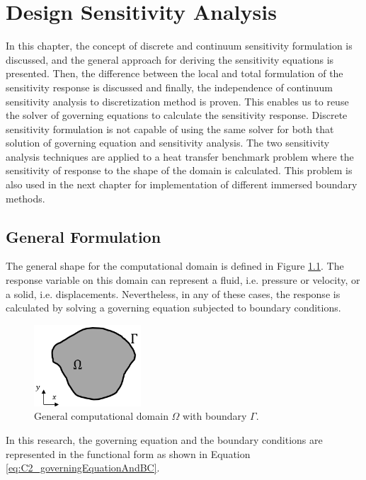 \chapter{Design Sensitivity Analysis}\label{ch:sensitivityAnalysis}
In this chapter, the concept of discrete and continuum sensitivity formulation is discussed, and the general approach for deriving the sensitivity equations is presented. Then, the difference between the local and total formulation of the sensitivity response is discussed and finally, the independence of continuum sensitivity analysis to discretization method is proven. This enables us to reuse the solver of governing equations to calculate the sensitivity response. Discrete sensitivity formulation is not capable of using the same solver for both that solution of governing equation and sensitivity analysis. The two sensitivity analysis techniques are applied to a heat transfer benchmark problem where the sensitivity of response to the shape of the domain is calculated. This problem is also used in the next chapter for implementation of different immersed boundary methods.

\section{General Formulation}
The general shape for the computational domain is defined in Figure \ref{fig:C2_continuumDomain}. The response variable on this domain can represent a fluid, i.e. pressure or velocity, or a solid, i.e. displacements. Nevertheless, in any of these cases, the response is calculated by solving a governing equation subjected to boundary conditions. 

\begin{figure}
    \centering
    \includegraphics[width=4.00cm]{Chapter_2/figure/general_domain.png}
    \caption{General computational domain $\Omega$ with boundary $\Gamma$.}
    \label{fig:C2_continuumDomain}
\end{figure}

In this research, the governing equation and the boundary conditions are represented in the functional form as shown in Equation \eqref{eq:C2_governingEquationAndBC}.

